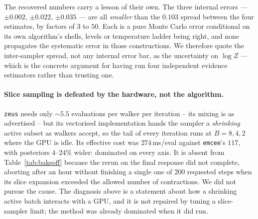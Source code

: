 \documentclass[11pt,a4paper]{article}
\newcommand{\code}[1]{\texttt{#1}}
\begin{document}
The recovered numbers carry a lesson of their own. The three internal errors
--- $\pm0.002$, $\pm0.022$, $\pm0.035$ --- are all \emph{smaller} than the
$0.103$ spread between the four estimates, by factors of $3$ to $50$. Each is a
pure Monte Carlo error conditional on its own algorithm's shells, levels or
temperature ladder being right, and none propagates the systematic error in
those constructions. We therefore quote the inter-sampler spread, not any
internal error bar, as the uncertainty on $\log Z$ --- which is the concrete
argument for having run four independent evidence estimators rather than
trusting one.

\paragraph{Slice sampling is defeated by the hardware, not the algorithm.}
\code{zeus} needs only ${\sim}5.5$ evaluations per walker per iteration -- its
mixing is as advertised -- but its vectorised implementation hands the sampler a
\emph{shrinking} active subset as walkers accept, so the tail of every iteration
runs at $B{=}8,4,2$ where the GPU is idle. Its effective cost was
$274\,$ms/eval against \code{emcee}'s $117$, with posteriors $4$--$24\%$ wider:
dominated on every axis. It is absent from Table~\ref{tab:bakeoff} because the
rerun on the final response did not complete, aborting after an hour without
finishing a single one of $200$ requested steps when its slice expansion
exceeded the allowed number of contractions. We did not pursue the cause. The
diagnosis above is a statement about how a shrinking active batch interacts with
a GPU, and it is not repaired by tuning a slice-sampler limit; the method was
already dominated when it did run.
\end{document}
